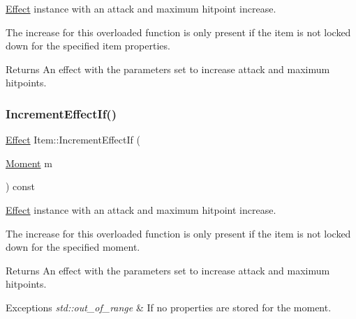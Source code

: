{\ttfamily \hyperlink{classitem_1_1_effect}{Effect}} instance with an attack and maximum hitpoint increase. 

The increase for this overloaded function is only present if the item is not locked down for the specified item properties. \begin{DoxyReturn}{Returns}
An effect with the parameters set to increase attack and maximum hitpoints. 
\end{DoxyReturn}
\mbox{\label{classitem_1_1_item_a35583f2bcdaea50728a9e16e0626e341}} 
\subsubsection{\texorpdfstring{Increment\+Effect\+If()}{IncrementEffectIf()}\hspace{0.1cm}{\footnotesize\ttfamily [2/2]}}
{\footnotesize\ttfamily \hyperlink{classitem_1_1_effect}{Effect} Item\+::\+Increment\+Effect\+If (\begin{DoxyParamCaption}\item[{\hyperlink{classtimeplane_1_1_moment}{Moment}}]{m }\end{DoxyParamCaption}) const\hspace{0.3cm}{\ttfamily [protected]}}



{\ttfamily \hyperlink{classitem_1_1_effect}{Effect}} instance with an attack and maximum hitpoint increase. 

The increase for this overloaded function is only present if the item is not locked down for the specified moment. \begin{DoxyReturn}{Returns}
An effect with the parameters set to increase attack and maximum hitpoints. 
\end{DoxyReturn}

\begin{DoxyExceptions}{Exceptions}
{\em std\+::out\+\_\+of\+\_\+range} & If no properties are stored for the moment. \\
\hline
\end{DoxyExceptions}
\mbox{\label{classitem_1_1_item_a93ef8f291ecf2886ea6902d496624334}} 
